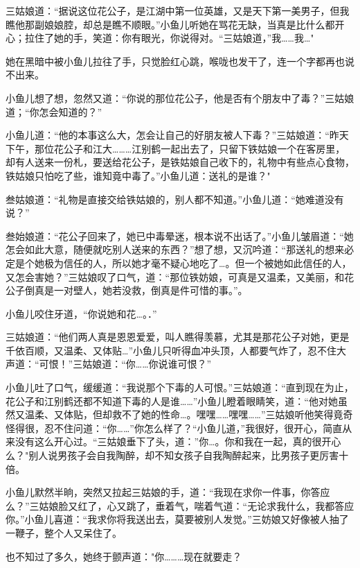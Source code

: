 \documentclass[12pt,oneside]{book}
\begin{document}
三姑娘道：``据说这位花公子，是江湖中第一位英雄，又是天下第一美男子，但我瞧他那副娘娘腔，却总是瞧不顺眼。''小鱼儿听她在骂花无缺，当真是比什么都开心；拉住了她的手，笑道：你有眼光，你说得对。``三姑娘道，''我\ldots\ldots 我\ldots"

她在黑暗中被小鱼儿拉往了手，只觉脸红心跳，喉咙也发干了，连一个字都再也说不出来。

小鱼儿想了想，忽然又道：``你说的那位花公子，他是否有个朋友中了毒？''三姑娘道；``你怎会知道的？''

小鱼儿道：``他的本事这么大，怎会让自己的好朋友被人下毒？''三姑娘道：``昨天下午，那位花公子和江大\ldots\ldots\ldots 江别鹤一起出去了，只留下铁姑娘一个在客房里，却有人送来一份札，要送给花公子，是铁姑娘自己收下的，礼物中有些点心食物，铁姑娘只怕吃了些，谁知竟中毒了。''小鱼儿道：送礼的是谁？"

叁姑娘道：``礼物是直接交给铁姑娘的，别人都不知道。''小鱼儿道：``她难道没有说？''

叁始娘道：``花公子回来了，她已中毒晕迷，根本说不出话了。''小鱼儿皱眉道：``她怎会如此大意，随便就吃别人送来的东西？''想了想，又沉吟道：``那送礼的想来必定是个她极为信任的人，所以她才毫不疑心地吃了\ldots。但一个被她如此信任的人，又怎会害她？''三姑娘叹了口气，道：``那位铁妨娘，可真是又温柔，又美丽，和花公子倒真是一对壁人，她若没救，倒真是件可惜的事。''。

小鱼儿咬住牙道，``你说她和花\ldots。．''

三姑娘道：``他们两人真是恩恩爱爱，叫人瞧得羡慕，尤其是那花公子对她，更是千依百顺，又温柔、又体贴\ldots{}''小鱼儿只听得血冲头顶，人都要气炸了，忍不住大声道：``可恨！''三姑娘道：``你\ldots\ldots 你说谁可恨？''

小鱼儿吐了口气，缓缓道：``我说那个下毒的人可恨。''三姑娘道：``直到现在为止，花公子和江别鹤还都不知道下毒的人是谁\ldots\ldots{}''小鱼儿瞪着眼睛笑，道：``他对她虽然又温柔、又体贴，但却救不了她的性命\ldots。嘿嘿\ldots\ldots 嘿嘿\ldots\ldots{}''三姑娘听他笑得竟奇怪得很，忍不住问道：``你\ldots\ldots{}''你怎么样了？``小鱼儿道，''我很好，很开心，简直从来没有这么开心过。``三姑娘垂下了头，道：''你\ldots。你和我在一起，真的很开心么？"别人说男孩子会自我陶醉，却不知女孩子自我陶醉起来，比男孩子更厉害十倍。

小鱼儿默然半晌，突然又拉起三姑娘的手，道：``我现在求你一件事，你答应么？''三姑娘脸又红了，心又跳了，垂着气，喘着气道：``无论求我什么，我都答应你。''小鱼儿喜道：``我求你将我送出去，莫要被别人发觉。''三妨娘又好像被人抽了一鞭子，整个人又呆住了。

也不知过了多久，她终于颤声道："你\ldots\ldots\ldots 现在就要走？
\end{document}

